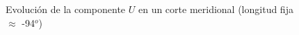 \begin{figure}[!ht]
\centering
  \hfill{}\hfill
  \hfill

  \hfill{}\hfill
  \hfill
  \caption{Evoluci\'on de la componente $U$ en un corte meridional (longitud fija $\approx$ -94$^o$)}%
\label{fig:uno}
\end{figure}
